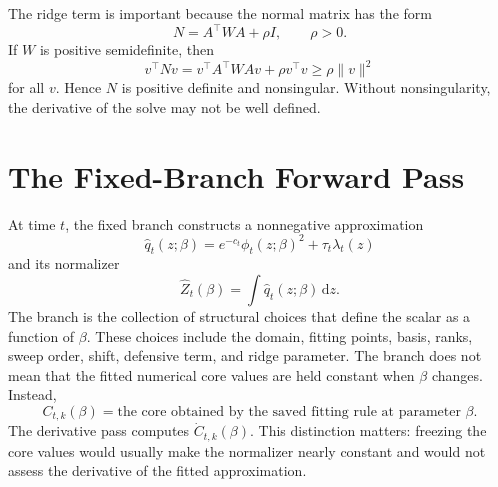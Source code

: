 \documentclass[11pt]{article}
\newcommand{\dd}{\,\mathrm d}
\begin{document}
The ridge term is important because the normal matrix has the form
\[
    N=A^\top W A+\rho I,
    \qquad \rho>0.
    \tag{P19-42}
\]
If \(W\) is positive semidefinite, then
\[
    v^\top N v
    =
    v^\top A^\top W A v+\rho v^\top v
    \ge
    \rho\|v\|^2
    \tag{P19-43}
\]
for all \(v\).  Hence \(N\) is positive definite and nonsingular.  Without
nonsingularity, the derivative of the solve may not be well defined.

\section{The Fixed-Branch Forward Pass}

At time \(t\), the fixed branch constructs a nonnegative approximation
\[
    \widehat q_t(z;\beta)
    =
    e^{-c_t}\phi_t(z;\beta)^2+\tau_t\lambda_t(z)
    \tag{P19-44}
\]
and its normalizer
\[
    \widehat Z_t(\beta)=\int \widehat q_t(z;\beta)\dd z.
    \tag{P19-45}
\]
The branch is the collection of structural choices that define the scalar as a
function of \(\beta\).  These choices include the domain, fitting points, basis,
ranks, sweep order, shift, defensive term, and ridge parameter.  The branch does
not mean that the fitted numerical core values are held constant when
\(\beta\) changes.  Instead,
\[
    C_{t,k}(\beta)
    =
    \text{the core obtained by the saved fitting rule at parameter }\beta.
    \tag{P19-45a}
\]
The derivative pass computes \(\dot C_{t,k}(\beta)\).  This distinction matters:
freezing the core values would usually make the normalizer nearly constant and
would not assess the derivative of the fitted approximation.
\end{document}
